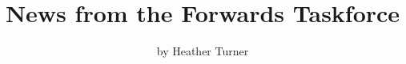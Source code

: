\title{News from the Forwards Taskforce}
\author{by Heather Turner}

\maketitle

\begin{verbatim}
\end{verbatim}


\address{%
Heather Turner\\
\\%
\\
%
%
%
%
}
